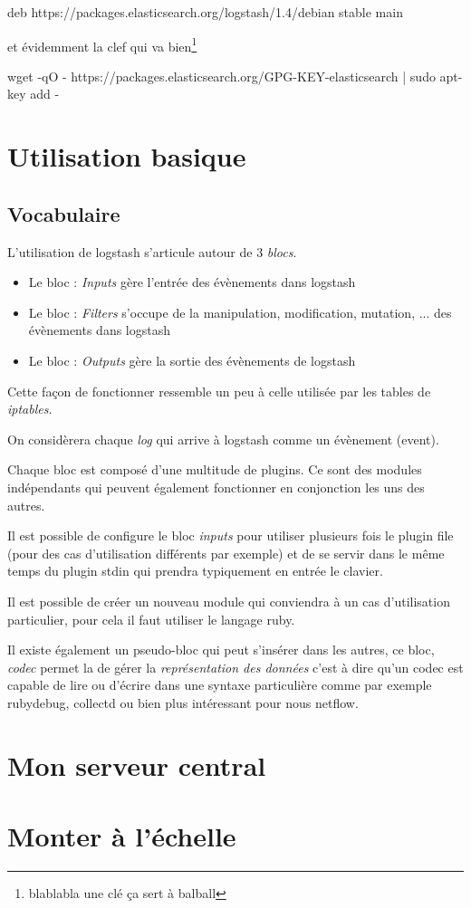 deb https://packages.elasticsearch.org/logstash/1.4/debian stable main

et évidemment la clef qui va bien\footnote{blablabla une clé ça sert à balball}

wget -qO - https://packages.elasticsearch.org/GPG-KEY-elasticsearch | sudo apt-key add -



\section{Utilisation basique}

\subsection{Vocabulaire}
L'utilisation de logstash s'articule autour de 3 \emph{blocs}.
\begin{itemize}
    \item   Le bloc : \emph{Inputs} gère l'entrée des évènements dans logstash
    \item   Le bloc : \emph{Filters} s'occupe de la manipulation, modification, mutation, ...
    des évènements dans logstash
    \item   Le bloc : \emph{Outputs} gère la sortie des évènements de logstash
\end{itemize}

Cette façon de fonctionner ressemble un peu à celle utilisée par les tables de 
\emph{iptables}.

On considèrera chaque \emph{log} qui arrive à logstash comme un évènement (event).

Chaque bloc est composé d'une multitude de plugins. Ce sont des modules indépendants
qui peuvent également fonctionner en conjonction les uns des autres.

Il est possible de configure le bloc \emph{inputs} pour utiliser plusieurs fois 
le plugin file (pour des cas d'utilisation différents par exemple) et de se servir 
dans le même temps du plugin stdin qui prendra typiquement en entrée le clavier.


Il est possible de créer un nouveau module qui conviendra à un cas d'utilisation 
particulier, pour cela il faut utiliser le langage ruby.


Il existe également un pseudo-bloc qui peut s'insérer dans les autres, ce bloc, \emph{codec} 
permet la de gérer la \textit{représentation des données} c'est à dire qu'un codec
est capable de lire ou d'écrire dans une syntaxe particulière comme par exemple 
rubydebug, collectd ou bien plus intéressant pour nous netflow.
\section{Mon serveur central}



\section{Monter à l'échelle}
